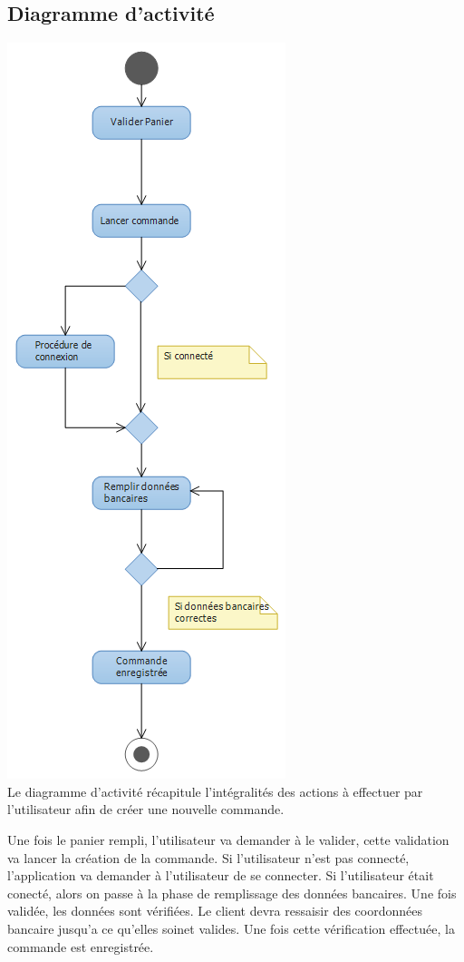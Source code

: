 \subsection{Diagramme d'activité}
\includegraphics[scale=0.5]{Res/activityCOmmande.png}\\
Le diagramme d'activité récapitule l'intégralités des actions à effectuer par l'utilisateur afin de créer une nouvelle commande.

Une fois le panier rempli, l'utilisateur va demander à le valider, cette validation va lancer la création de la commande. Si l'utilisateur n'est pas connecté, l'application va demander à l'utilisateur de se connecter.
Si l'utilisateur était conecté, alors on passe à la phase de remplissage des données bancaires. Une fois validée, les données sont vérifiées. Le client devra ressaisir des coordonnées bancaire jusqu'a ce qu'elles soinet valides.
Une fois cette vérification effectuée, la commande est enregistrée.
\clearpage
